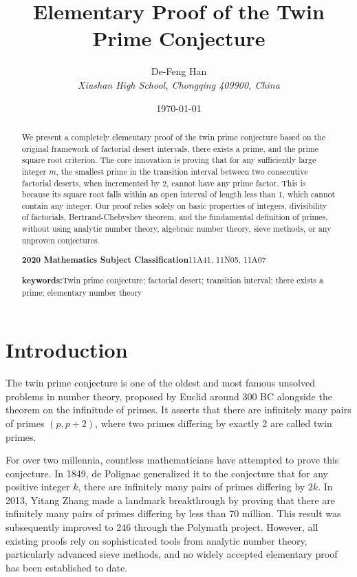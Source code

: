 \documentclass[12pt,letterpaper,reqno]{amsart}
\title{Elementary Proof of the Twin Prime Conjecture}
\author{De-Feng Han \\\textit{Xiushan  High School, Chongqing 409900, China} } %
\date{\today}
\theoremstyle{plain}
\theoremstyle{definition}
\theoremstyle{remark}
\begin{document}
	\maketitle
	
	\begin{abstract}
		We present a completely elementary proof of the twin prime conjecture based on the original framework of factorial desert intervals, there exists a prime, and the prime square root criterion. The core innovation is proving that for any sufficiently large integer $m$, the smallest prime in the transition interval between two consecutive factorial deserts, when incremented by 2, cannot have any prime factor. This is because its square root falls within an open interval of length less than 1, which cannot contain any integer. Our proof relies solely on basic properties of integers, divisibility of factorials, Bertrand-Chebyshev theorem, and the fundamental definition of primes, without using analytic number theory, algebraic number theory, sieve methods, or any unproven conjectures.
		\vspace{1em}
		\par
		\textbf{2020 Mathematics Subject  Classification}11A41, 11N05, 11A07
		\vspace{0.5em}
		\par
		\textbf {keywords:}Twin prime conjecture; factorial desert; transition interval; there exists a prime; elementary number theory
	\end{abstract}
	
	
	\section{Introduction}
	The twin prime conjecture is one of the oldest and most famous unsolved problems in number theory, proposed by Euclid around 300 BC alongside the theorem on the infinitude of primes. It asserts that there are infinitely many pairs of primes $(p, p+2)$, where two primes differing by exactly 2 are called twin primes.
	
	For over two millennia, countless mathematicians have attempted to prove this conjecture. In 1849, de Polignac generalized it to the conjecture that for any positive integer $k$, there are infinitely many pairs of primes differing by $2k$. In 2013, Yitang Zhang made a landmark breakthrough by proving that there are infinitely many pairs of primes differing by less than 70 million. This result was subsequently improved to 246 through the Polymath project. However, all existing proofs rely on sophisticated tools from analytic number theory, particularly advanced sieve methods, and no widely accepted elementary proof has been established to date.
	
\end{document}
